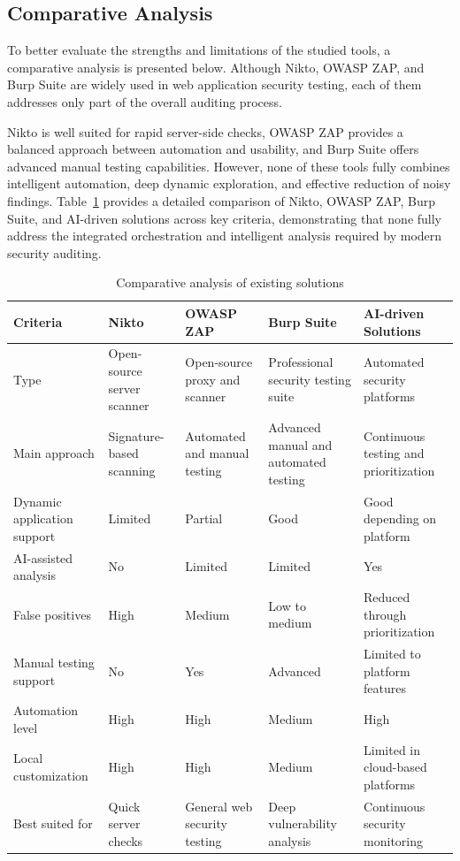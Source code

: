 \subsection{Comparative Analysis}

\indent To better evaluate the strengths and limitations of the studied tools, a comparative analysis is presented below. Although Nikto, OWASP ZAP, and Burp Suite are widely used in web application security testing, each of them addresses only part of the overall auditing process.

\indent Nikto is well suited for rapid server-side checks, OWASP ZAP provides a balanced approach between automation and usability, and Burp Suite offers advanced manual testing capabilities. However, none of these tools fully combines intelligent automation, deep dynamic exploration, and effective reduction of noisy findings. Table~\ref{tab:comparative-analysis} provides a detailed comparison of Nikto, OWASP ZAP, Burp Suite, and AI-driven solutions across key criteria, demonstrating that none fully address the integrated orchestration and intelligent analysis required by modern security auditing.




\begin{table}[H]
    \centering
    \caption{Comparative analysis of existing solutions}
    \label{tab:comparative-analysis}
    \renewcommand{\arraystretch}{1.25}
    \begin{tabularx}{\textwidth}{|p{2.8cm}|X|X|X|X|}
        \hline
        \textbf{Criteria} & \textbf{Nikto} & \textbf{OWASP ZAP} & \textbf{Burp Suite} & \textbf{AI-driven Solutions} \\
        \hline
        Type & Open-source server scanner & Open-source proxy and scanner & Professional security testing suite & Automated security platforms \\
        \hline
        Main approach & Signature-based scanning & Automated and manual testing & Advanced manual and automated testing & Continuous testing and prioritization \\
        \hline
        Dynamic application support & Limited & Partial & Good & Good depending on platform \\
        \hline
        AI-assisted analysis & No & Limited & Limited & Yes \\
        \hline
        False positives & High & Medium & Low to medium & Reduced through prioritization \\
        \hline
        Manual testing support & No & Yes & Advanced & Limited to platform features \\
        \hline
        Automation level & High & High & Medium & High \\
        \hline
        Local customization & High & High & Medium & Limited in cloud-based platforms \\
        \hline
        Best suited for & Quick server checks & General web security testing & Deep vulnerability analysis & Continuous security monitoring \\
        \hline
    \end{tabularx}
\end{table}

